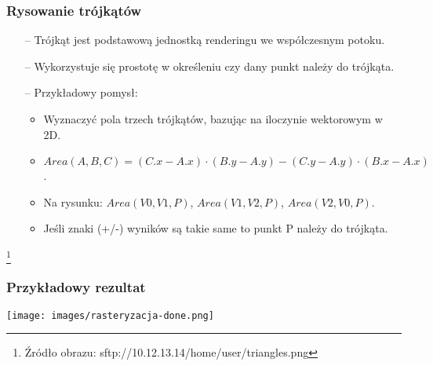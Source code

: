 \documentclass[usenames,dvipsnames,aspectratio=43,presentation]{beamer}
\begin{document}
    \begin{frame}
        \frametitle{Rysowanie trójkątów}
        \footnotesize

        \begin{itemize}
            \setlength{\itemsep}{-0.1em}
            \item[--] Trójkąt jest podstawową jednostką renderingu we współczesnym potoku.
            \item[--] Wykorzystuje się prostotę w określeniu czy dany punkt należy do trójkąta.
            \item[--] Przykładowy pomysł:
                      \begin{itemize}
                          \setlength{\itemsep}{0.1em}
                          \scriptsize
                          \item Wyznaczyć pola trzech trójkątów, bazując na iloczynie wektorowym w 2D.
                          \item $Area(A, B, C) = (C.x - A.x) \cdot (B.y - A.y) - (C.y - A.y) \cdot (B.x - A.x)$.
                          \item Na rysunku: $Area(V0, V1, P)$, $Area(V1, V2, P)$, $Area(V2, V0, P)$.
                          \item Jeśli znaki (+/-) wyników są takie same to punkt P należy do trójkąta.
                          \label{triangle-draw}
                      \end{itemize}
        \end{itemize}

        \vfill

        \begin{minipage}{\textwidth}
            \centering

        \end{minipage}

        \let\thefootnote\relax\footnote[frame]{
            \tiny
            \hspace{-3.25em}
            Źródło obrazu:
            sftp://10.12.13.14/home/user/triangles.png
        }
    \end{frame}


    \begin{frame}
        \frametitle{Przykładowy rezultat}
        \footnotesize

        \begin{minipage}{\textwidth}
            \centering

            \texttt{[image: images/rasteryzacja-done.png]}
        \end{minipage}
    \end{frame}
\end{document}
